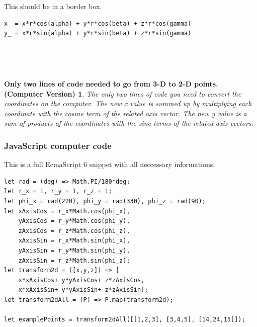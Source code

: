 \documentclass[a4paper]{article}
\begin{document}
\begin{Example}
This should be in a border box.\\

\begin{example}
\begin{lstlisting}
x_ = x*r*cos(alpha) + y*r*cos(beta) + z*r*cos(gamma)
y_ = x*r*sin(alpha) + y*r*sin(beta) + z*r*sin(gamma)
\end{lstlisting}\\

\end{example}\\

\newtheorem{CodeTheorem}{Only two lines of code needed to go from 3-D to 2-D points. (Computer Version)}
\begin{CodeTheorem}
The only two lines of code you need to convert the coordinates on the computer. The new x value
is summed up by multiplying each coordinate with the cosine term of the related axis vector. The new y value
is a sum of products of the coordinates with the sine terms of the related axis vectors.
\end{CodeTheorem}

\subsubsection{JavaScript computer code}
\begin{example}
This is a full EcmaScript 6 snippet with all neccessary informations.\\
\begin{lstlisting}
let rad = (deg) => Math.PI/180*deg;
let r_x = 1, r_y = 1, r_z = 1; 
let phi_x = rad(220), phi_y = rad(330), phi_z = rad(90); 
let xAxisCos = r_x*Math.cos(phi_x), 
    yAxisCos = r_y*Math.cos(phi_y),
    zAxisCos = r_z*Math.cos(phi_z),
    xAxisSin = r_x*Math.sin(phi_x), 
    yAxisSin = r_y*Math.sin(phi_y),
    zAxisSin = r_z*Math.sin(phi_z);
let transform2d = ([x,y,z]) => [
    x*xAxisCos+ y*yAxisCos+ z*zAxisCos,
    x*xAxisSin+ y*yAxisSin+ z*zAxisSin];
let transform2dAll = (P) => P.map(transform2d);

let examplePoints = transform2dAll([[1,2,3], [3,4,5], [14,24,15]]);
\end{lstlisting}
\end{example}\\


\end{Example}
\end{document}
